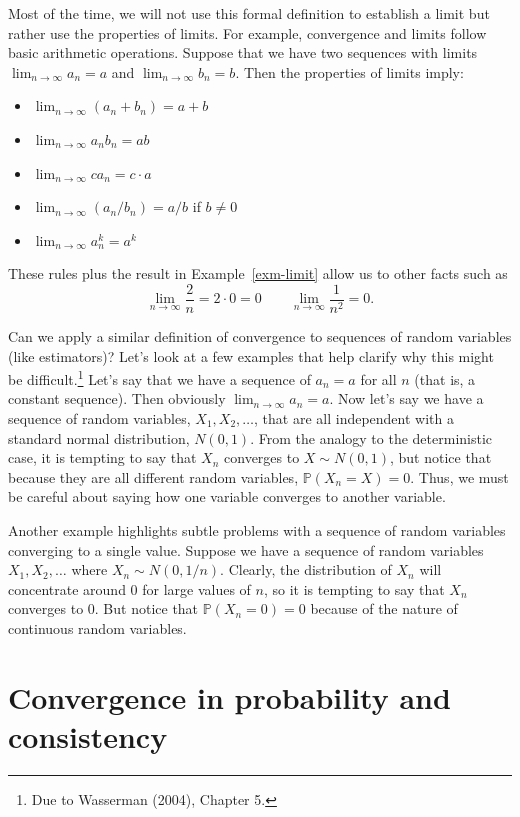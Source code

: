 \documentclass[
  letterpaper,
  DIV=11,
  numbers=noendperiod]{scrreprt}
\providecommand{\tightlist}{%
  \setlength{\itemsep}{0pt}\setlength{\parskip}{0pt}}\usepackage{longtable,booktabs,array}
\renewcommand{\P}{\mathbb{P}}
\theoremstyle{definition}
\theoremstyle{definition}
\theoremstyle{plain}
\theoremstyle{remark}
\begin{document}
Most of the time, we will not use this formal definition to establish a
limit but rather use the properties of limits. For example, convergence
and limits follow basic arithmetic operations. Suppose that we have two
sequences with limits \(\lim_{n\to\infty} a_n = a\) and
\(\lim_{n\to\infty} b_n = b\). Then the properties of limits imply:

\begin{itemize}
\tightlist
\item
  \(\lim_{n\to\infty} (a_n + b_n) = a + b\)
\item
  \(\lim_{n\to\infty} a_nb_n = ab\)
\item
  \(\lim_{n\to\infty} ca_n = c\cdot a\)
\item
  \(\lim_{n\to\infty} (a_n/b_n) = a/b\) if \(b \neq 0\)
\item
  \(\lim_{n\to\infty} a_n^{k} = a^{k}\)
\end{itemize}

These rules plus the result in Example~\ref{exm-limit} allow us to other
facts such as \[
\lim_{n\to\infty} \frac{2}{n} = 2 \cdot 0 = 0 \qquad  \lim_{n\to\infty} \frac{1}{n^{2}} = 0.
\]

Can we apply a similar definition of convergence to sequences of random
variables (like estimators)? Let's look at a few examples that help
clarify why this might be difficult.\footnote{Due to Wasserman (2004),
  Chapter 5.} Let's say that we have a sequence of \(a_n = a\) for all
\(n\) (that is, a constant sequence). Then obviously
\(\lim_{n\rightarrow\infty} a_n = a\). Now let's say we have a sequence
of random variables, \(X_1, X_2, \ldots\), that are all independent with
a standard normal distribution, \(N(0,1)\). From the analogy to the
deterministic case, it is tempting to say that \(X_n\) converges to
\(X \sim N(0, 1)\), but notice that because they are all different
random variables, \(\P(X_n = X) = 0\). Thus, we must be careful about
saying how one variable converges to another variable.

Another example highlights subtle problems with a sequence of random
variables converging to a single value. Suppose we have a sequence of
random variables \(X_1, X_2, \ldots\) where \(X_n \sim N(0, 1/n)\).
Clearly, the distribution of \(X_n\) will concentrate around 0 for large
values of \(n\), so it is tempting to say that \(X_n\) converges to 0.
But notice that \(\P(X_n = 0) = 0\) because of the nature of continuous
random variables.

\hypertarget{convergence-in-probability-and-consistency}{%
\section{Convergence in probability and
consistency}\label{convergence-in-probability-and-consistency}}
\end{document}
